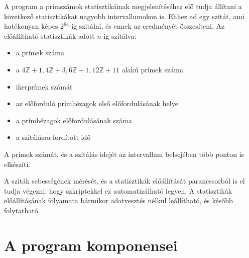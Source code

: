 A program a prímszámok statisztikáinak megjelenítéséhez elő tudja állítani a következő statisztikákat nagyobb intervallumokon is.
Ehhez ad egy szitát, ami hatékonyan képes $2^{64}$-ig szitálni, és ennek az eredményét összesíteni.
Az előállítható statisztikák adott $n$-ig szitálva:
\begin{itemize}
\item a prímek száma
\item a $4\mathbb{Z}+1, 4\mathbb{Z}+3, 6\mathbb{Z}+1, 12\mathbb{Z}+11$ alakú prímek száma
\item ikerprímek számát
\item az előforduló prímhézagok első előfordulásának helye
\item a prímhézagok előfordulásának száma
\item a szitálásra fordított idő
\end{itemize}

A prímek számát, és a szitálás idejét az intervallum belsejében több ponton is elkészíti.

A sziták sebességének mérését, és a statisztikák előállítását parancssorból is el tudja végezni, hogy szkriptekkel ez automatizálható legyen.
A statisztikák előállításának folyamata bármikor adatvesztés nélkül leállítható, és később folytatható.

\pagebreak
\section{A program komponensei}

